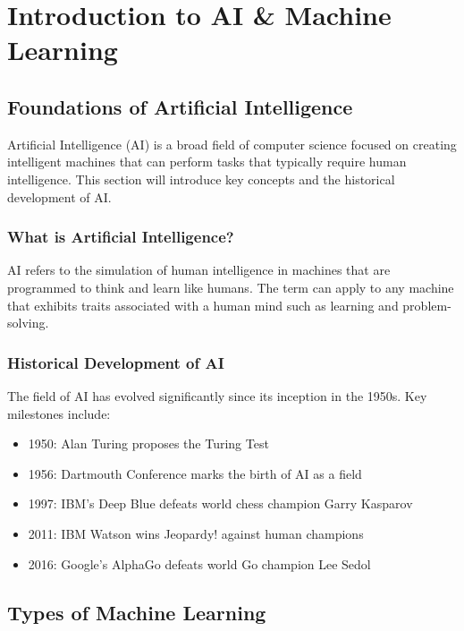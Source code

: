 

\chapter{Introduction to AI \& Machine Learning}

\section{Foundations of Artificial Intelligence}

Artificial Intelligence (AI) is a broad field of computer science
focused on creating intelligent machines that can perform tasks that
typically require human intelligence. This section will introduce key
concepts and the historical development of AI.

\subsection{What is Artificial Intelligence?}

AI refers to the simulation of human intelligence in machines that are
programmed to think and learn like humans. The term can apply to any
machine that exhibits traits associated with a human mind such as
learning and problem-solving.

\subsection{Historical Development of AI}

The field of AI has evolved significantly since its inception in the
1950s. Key milestones include:

\begin{itemize}
    \item 1950: Alan Turing proposes the Turing Test
    \item 1956: Dartmouth Conference marks the birth of AI as a field
    \item 1997: IBM's Deep Blue defeats world chess champion Garry Kasparov
    \item 2011: IBM Watson wins Jeopardy! against human champions
    \item 2016: Google's AlphaGo defeats world Go champion Lee Sedol
\end{itemize}

\section{Types of Machine Learning}

